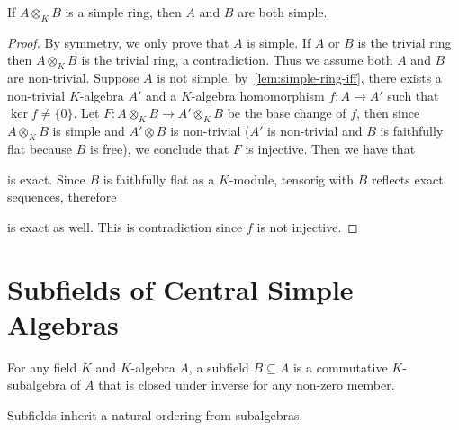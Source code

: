 \begin{theorem}\label{thm:tensor-simple-implies-simple}
  If $A\otimes_{K} B$ is a simple ring, then $A$ and $B$ are both simple.
  \leanok
\end{theorem}
\begin{proof}
  By symmetry, we only prove that $A$ is simple.
  If $A$ or $B$ is the trivial ring then $A\otimes_{K} B$ is the trivial ring, a contradiction. Thus we assume both $A$ and $B$ are non-trivial. Suppose $A$ is not simple, by~\cref{lem:simple-ring-iff}, there exists a non-trivial $K$-algebra $A'$ and a $K$-algebra homomorphism $f : A \to A'$ such that $\ker f \not= \{0\}$. Let $F : A \otimes_{K} B\to A'\otimes_{K} B$ be the base change of $f$, then since $A\otimes_{K} B$ is simple and $A'\otimes B$ is non-trivial ($A'$ is non-trivial and $B$ is faithfully flat because $B$ is free), we conclude that $F$ is injective. Then we have that
  \begin{center}
  \end{center}
  is exact. Since $B$ is faithfully flat as a $K$-module, tensorig with $B$ reflects exact sequences, therefore
  \begin{center}
  \end{center}
  is exact as well. This is contradiction since $f$ is not injective.
\end{proof}

\section{Subfields of Central Simple Algebras}\label{sec:subfield}

\begin{definition}[Subfield]
  For any field $K$ and $K$-algebra $A$, a subfield $B \subseteq A$ is a commutative $K$-subalgebra of $A$ that is closed under inverse for any non-zero member.
  \leanok
\end{definition}

\begin{remark}
  Subfields inherit a natural ordering from subalgebras.
\end{remark}


